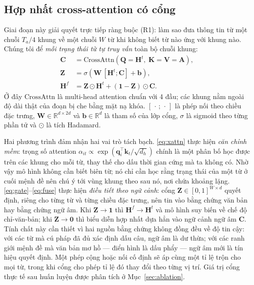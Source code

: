 \documentclass[conference,onecolumn]{IEEEtran}
\begin{document}
\subsection{Hợp nhất cross-attention có cổng}
\label{sec:fusion}
Giai đoạn này giải quyết trực tiếp ràng buộc (R1): làm sao đưa thông tin từ một
chuỗi $T_a/4$ khung về một chuỗi $W$ từ khi không biết từ nào ứng với khung nào.
Chúng tôi để \emph{mỗi trạng thái từ tự truy vấn} toàn bộ chuỗi khung:
\begin{align}
\mathbf{C} &= \mathrm{CrossAttn}(\mathbf{Q}{=}\mathbf{H}^{t},\;
              \mathbf{K}{=}\mathbf{V}{=}\mathbf{A}), \label{eq:xattn}\\
\mathbf{Z} &= \sigma\!\left(\mathbf{W}\,[\mathbf{H}^{t};\mathbf{C}] + \mathbf{b}\right), \label{eq:gate}\\
\mathbf{H}^{f} &= \mathbf{Z}\odot\mathbf{H}^{t} + (\mathbf{1}-\mathbf{Z})\odot\mathbf{C}. \label{eq:fuse}
\end{align}
Ở đây $\mathrm{CrossAttn}$ là multi-head attention chuẩn với 4 đầu; các khung nằm
ngoài độ dài thật của đoạn bị che bằng mặt nạ khóa. $[\,\cdot\,;\,\cdot\,]$ là phép
nối theo chiều đặc trưng, $\mathbf{W}\!\in\!\mathbb{R}^{d\times 2d}$ và
$\mathbf{b}\!\in\!\mathbb{R}^{d}$ là tham số của lớp cổng, $\sigma$ là sigmoid theo
từng phần tử và $\odot$ là tích Hadamard.

Hai phương trình đảm nhận hai vai trò tách bạch.
\eqref{eq:xattn} thực hiện \emph{căn chỉnh mềm}: trọng số attention
$\alpha_{it}\propto\exp(\mathbf{q}_i^{\top}\mathbf{k}_t/\sqrt{d_h})$ chính là một
phân bố học được trên các khung cho mỗi từ, thay thế cho dấu thời gian cứng mà ta
không có. Nhờ vậy mô hình không cần biết biên từ; nó chỉ cần học rằng trạng thái
của một từ ở cuối mệnh đề nên chú ý tới vùng khung theo sau nó, nơi chứa khoảng
lặng.
\eqref{eq:gate}--\eqref{eq:fuse} thực hiện \emph{điều tiết theo ngữ cảnh}: cổng
$\mathbf{Z}\!\in\![0,1]^{W\times d}$ quyết định, riêng cho từng từ và từng chiều
đặc trưng, nên tin vào bằng chứng văn bản hay bằng chứng ngữ âm. Khi
$\mathbf{Z}\!\to\!\mathbf{1}$ thì $\mathbf{H}^{f}\!\to\!\mathbf{H}^{t}$ và mô hình
suy biến về chế độ chỉ-văn-bản; khi $\mathbf{Z}\!\to\!\mathbf{0}$ thì biểu diễn
hợp nhất dựa hẳn vào ngữ cảnh ngữ âm $\mathbf{C}$. Tính chất này cần thiết vì hai
nguồn bằng chứng không đồng đều về độ tin cậy: với các từ mà cú pháp đã đủ xác định
dấu câu, ngữ âm là dư thừa; với các ranh giới mệnh đề mà văn bản mơ hồ --- điển
hình là dấu phẩy --- ngữ âm mới là tín hiệu quyết định. Một phép cộng hoặc nối cố
định sẽ áp cùng một tỉ lệ trộn cho mọi từ, trong khi cổng cho phép tỉ lệ đó thay
đổi theo từng vị trí. Giá trị cổng thực tế sau huấn luyện được phân tích ở
Mục~\ref{sec:ablation}.
\end{document}
